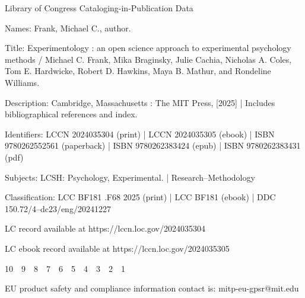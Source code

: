 \begin{titlepage}
{    {\raggedright
    \leftskip 0.1in
    \parindent -0.1in
    Library of Congress Cataloging-in-Publication Data
    \parskip 0in
    
    Names: Frank, Michael C., author.
    
    Title: Experimentology : an open science approach to experimental 
       psychology methods / Michael C. Frank, Mika Braginsky, Julie Cachia, 
       Nicholas A. Coles, Tom E. Hardwicke, Robert D. Hawkins, Maya B. Mathur, and 
       Rondeline Williams.
      
    Description: Cambridge, Massachusetts : The MIT Press, [2025] | Includes 
       bibliographical references and index.
       
    Identifiers: LCCN 2024035304 (print) | LCCN 2024035305 (ebook) | ISBN 
       9780262552561 (paperback) | ISBN 9780262383424 (epub) | ISBN 
       9780262383431 (pdf)
       
    Subjects: LCSH: Psychology, Experimental. | Research--Methodology
    
    Classification: LCC BF181 .F68 2025  (print) | LCC BF181  (ebook) | DDC 
       150.72/4--dc23/eng/20241227
       
    LC record available at https://lccn.loc.gov/2024035304
    
    LC ebook record available at https://lccn.loc.gov/2024035305\par
    }
    10 9 8 7 6 5 4 3 2 1\par
    \vspace{2ex}
    EU product safety and compliance information contact is: mitp-eu-gpsr@mit.edu
  }
  \vspace*{\fill}
\end{titlepage}

\restoregeometry{}
